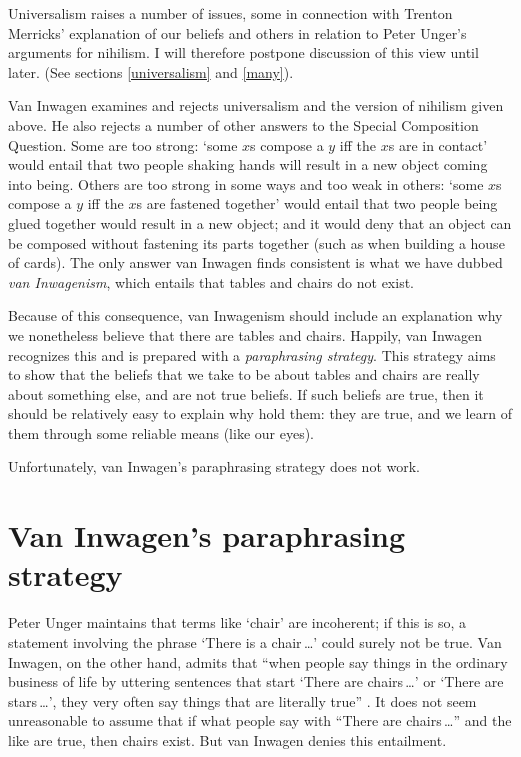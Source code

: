 \documentclass[11pt]{article}
\begin{document}
\begin{spacing}{1.5}
Universalism raises a number of issues, some in connection with
Trenton Merricks' explanation of our beliefs and others in relation to
Peter Unger's arguments for nihilism.  I will therefore postpone
discussion of this view until later.  (See sections \ref{universalism}
and \ref{many}).

Van Inwagen examines and rejects universalism and the version of
nihilism given above.  He also rejects a number of other answers to
the Special Composition Question.  Some are too strong: `some $x$s
compose a $y$ iff the $x$s are in contact' would entail that two
people shaking hands will result in a new object coming into being.
Others are too strong in some ways and too weak in others: `some $x$s
compose a $y$ iff the $x$s are fastened together' would entail that
two people being glued together would result in a new object; and it
would deny that an object can be composed without fastening its parts
together (such as when building a house of cards).  The only answer
van Inwagen finds consistent is what we have dubbed {\em van
  Inwagenism}, which entails that tables and chairs do not exist.

Because of this consequence, van Inwagenism should include an
explanation why we nonetheless believe that there are tables and
chairs.  Happily, van Inwagen recognizes this and is prepared with a
{\em paraphrasing strategy}.  This strategy aims to show that the
beliefs that we take to be about tables and chairs are really about
something else, and are not true beliefs.  If such beliefs are true,
then it should be relatively easy to explain why hold them: they are
true, and we learn of them through some reliable means (like our
eyes).

Unfortunately, van Inwagen's paraphrasing strategy does not work.

\section{Van Inwagen's paraphrasing strategy}
\label{i-para}
Peter Unger maintains that terms like `chair' are incoherent; if this
is so, a statement involving the phrase `There is a chair\,\ldots '
could surely not be true.  Van Inwagen, on the other hand, admits that
``when people say things in the ordinary business of life by uttering
sentences that start `There are chairs\,\ldots ' or `There are
stars\,\ldots ', they very often say things that are literally true''
\cite[102]{inwagen1995}.  It does not seem unreasonable to assume that
if what people say with ``There are chairs\,\ldots '' and the like are
true, then chairs exist.  But van Inwagen denies this entailment.


\end{spacing}
\end{document}
